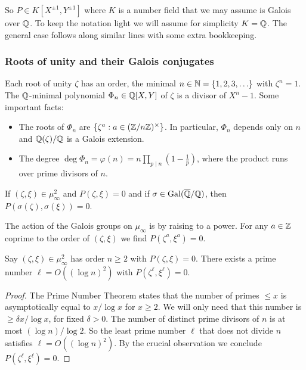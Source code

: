 So $P \in K[X^{\pm 1},Y^{\pm 1}]$ where $K$ is a number field that we may assume is
Galois over ${\mathbb{Q}}$. To keep the notation light we will assume for
simplicity $K={\mathbb{Q}}$. The general case follows along similar lines with
some extra bookkeeping.

\subsubsection{Roots of unity and their Galois conjugates}

Each root of unity $\zeta$ has an order, the minimal
$n\in{\mathbb{N}}=\{1,2,3,\ldots\}$
with
$\zeta^n=1$. The ${\mathbb{Q}}$-minimal polynomial $\Phi_n\in{\mathbb{Q}}[X,Y]$
of $\zeta$ is a divisor of
$X^n-1$. Some important facts:

\begin{itemize}
\item The roots of $\Phi_n$ are $\{\zeta^a : a\in
  ({\mathbb{Z}}/n{\mathbb{Z}})^\times\}$. In particular, $\Phi_n$ depends only on $n$
  and ${\mathbb{Q}}(\zeta)/{\mathbb{Q}}$ is a Galois extension. 
\item The degree $\deg \Phi_n = \varphi(n)= n \prod_{p\mid n}
  \left(1-\frac 1p\right)$, where the product runs over prime divisors
  of $n$.
\end{itemize}

\begin{crucial}
  If $(\zeta,\xi)\in \mu_\infty^2$ and $P(\zeta,\xi)=0$ and if
  $\sigma\in \mathrm{Gal}({\overline{\mathbb{Q}}}/{\mathbb{Q}})$, then
  $P(\sigma(\zeta),\sigma(\xi))=0$.

  The action of the Galois groups on $\mu_\infty$ is by raising to a
  power. For any $a\in{\mathbb{Z}}$ coprime to the order of $(\zeta,\xi)$  
  we find $P(\zeta^a,\xi^a)=0$. 
\end{crucial}

\begin{lemma}
  Say $(\zeta,\xi)\in \mu_\infty^2$ has order $n\ge 2$
  with $P(\zeta,\xi)=0$. There exists a prime number $\ell=O((\log
  n)^2)$ with $P(\zeta^\ell,\xi^\ell)=0$. 
\end{lemma}
\begin{proof}
  The Prime Number Theorem states that the number of primes $\le x$ is
  asymptotically equal to $x/\log x$ for $x\ge 2$.
  We will only need that this number
  is $\ge \delta x/\log x$, for fixed $\delta >0$. 
  The number of
  distinct prime divisors of $n$ is at most $(\log n)/\log 2$.
  So the least prime number $\ell$ that does not divide $n$ satisfies $\ell =
  O((\log n)^2)$. By the crucial observation we conclude
  $P(\zeta^\ell,\xi^\ell)=0$. 
\end{proof}

